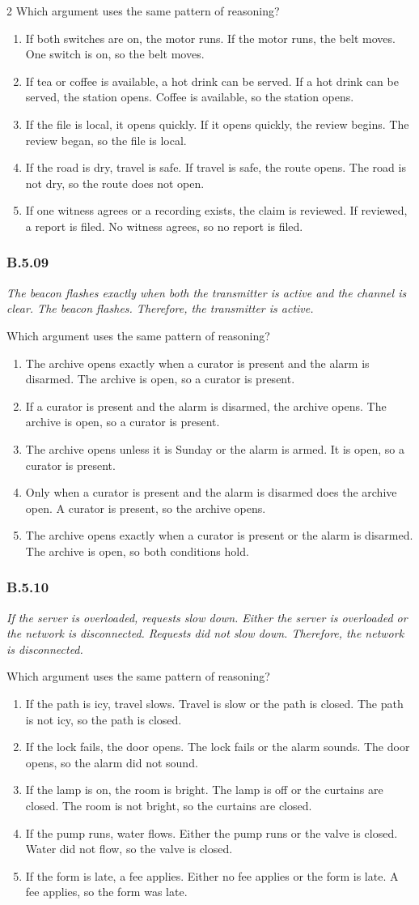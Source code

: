 \documentclass[10pt]{extarticle}
\newcommand{\choice}[1]{\item #1}
\newcommand{\bankitem}[1]{\subsubsection*{#1}}
\begin{document}
\begin{multicols}{2}
Which argument uses the same pattern of reasoning?
\begin{enumerate}[label=(\alph*)]
  \choice{If both switches are on, the motor runs. If the motor runs, the belt moves. One switch is on, so the belt moves.}
  \choice{If tea or coffee is available, a hot drink can be served. If a hot drink can be served, the station opens. Coffee is available, so the station opens.}
  \choice{If the file is local, it opens quickly. If it opens quickly, the review begins. The review began, so the file is local.}
  \choice{If the road is dry, travel is safe. If travel is safe, the route opens. The road is not dry, so the route does not open.}
  \choice{If one witness agrees or a recording exists, the claim is reviewed. If reviewed, a report is filed. No witness agrees, so no report is filed.}
\end{enumerate}
\bankitem{B.5.09}
\emph{The beacon flashes exactly when both the transmitter is active and the channel is clear. The beacon flashes. Therefore, the transmitter is active.}

Which argument uses the same pattern of reasoning?
\begin{enumerate}[label=(\alph*)]
  \choice{The archive opens exactly when a curator is present and the alarm is disarmed. The archive is open, so a curator is present.}
  \choice{If a curator is present and the alarm is disarmed, the archive opens. The archive is open, so a curator is present.}
  \choice{The archive opens unless it is Sunday or the alarm is armed. It is open, so a curator is present.}
  \choice{Only when a curator is present and the alarm is disarmed does the archive open. A curator is present, so the archive opens.}
  \choice{The archive opens exactly when a curator is present or the alarm is disarmed. The archive is open, so both conditions hold.}
\end{enumerate}
\bankitem{B.5.10}
\emph{If the server is overloaded, requests slow down. Either the server is overloaded or the network is disconnected. Requests did not slow down. Therefore, the network is disconnected.}

Which argument uses the same pattern of reasoning?
\begin{enumerate}[label=(\alph*)]
  \choice{If the path is icy, travel slows. Travel is slow or the path is closed. The path is not icy, so the path is closed.}
  \choice{If the lock fails, the door opens. The lock fails or the alarm sounds. The door opens, so the alarm did not sound.}
  \choice{If the lamp is on, the room is bright. The lamp is off or the curtains are closed. The room is not bright, so the curtains are closed.}
  \choice{If the pump runs, water flows. Either the pump runs or the valve is closed. Water did not flow, so the valve is closed.}
  \choice{If the form is late, a fee applies. Either no fee applies or the form is late. A fee applies, so the form was late.}
\end{enumerate}

\end{multicols}
\end{document}

